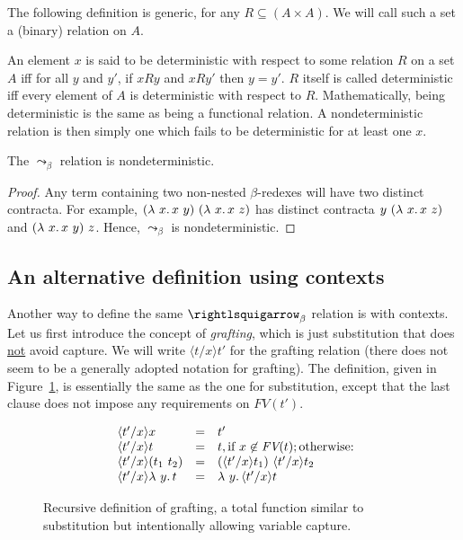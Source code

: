 \noindent The following definition is generic, for any $R\subseteq (A\times A)$.  We will call such
a set a (binary) relation on $A$.

\begin{definition}[determinism]
\label{def:det}
  An element $x$ is said to be deterministic with respect to some
  relation $R$ on a set $A$ iff for all $y$ and $y'$, if $x R y$ and
  $x R y'$ then $y = y'$.  $R$ itself is called deterministic iff
  every element of $A$ is deterministic with respect to $R$.
  Mathematically, being deterministic is the same as being a
  functional relation.  A nondeterministic relation is then simply one
  which fails to be deterministic for at least one
  $x$.
  \end{definition}

\begin{lemma}
  The $\leadsto_\beta$ relation is nondeterministic.
\end{lemma}
\begin{proof}
  Any term containing two non-nested $\beta$-redexes will have
  two distinct contracta.  For example, $(\lambda\ x.\, x\ y)\ (\lambda\ x.\, x\ z)$
  has distinct contracta $y\ (\lambda\ x.\, x\ z)$ and $(\lambda\ x.\, x\ y)\ z$.
  Hence, $\leadsto_\beta$ is nondeterministic.
\end{proof}

\subsection{An alternative definition using contexts}

Another way to define the same $\curva_\beta$ relation is with
contexts.  Let us first introduce the concept of \emph{grafting},
which is just substitution that does \underline{not} avoid
capture.  We will write $\langle t/x\rangle t'$ for
the grafting relation (there does not seem to be a generally adopted
notation for grafting).  The definition, given in
Figure~\ref{fig:grafting}, is essentially the same as the one for substitution,
except that the last clause does not impose
any requirements on $\textit{FV}(t')$.

\begin{figure}
\large
\[
  \begin{array}{lll}
\    \langle t'/x \rangle x & = & t' \\
\    \langle t'/x \rangle t & = & t, \textnormal{if }x\not\in\textit{FV}(t); \textnormal{otherwise:} \\
\    \langle t'/x \rangle(t_1\ t_2) & = & (\langle t'/x\rangle t_1)\ \langle t'/x\rangle t_2 \\
\    \langle t'/x\rangle\lambda\ y.\, t & = & \lambda\ y.\, \langle t'/x\rangle t
  \end{array}
\]
  \caption{Recursive definition of grafting, a total function similar to substitution but intentionally allowing variable capture.}
  \label{fig:grafting}
  \end{figure}

